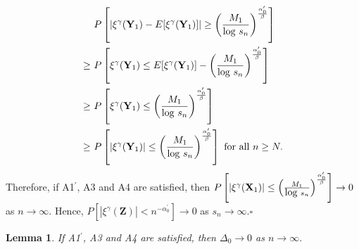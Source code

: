 \documentclass[twoside]{article}
\def\log{\hbox{log}}
\newcommand{\bX}{\mathbf{X}}
\newcommand{\bY}{\mathbf{Y}}
\newcommand{\bZ}{\mathbf{Z}}
\newcommand{\0}{\mathbf{0}}
\newcommand{\1}{\mathbf{1}}
\newcommand*{\QEDB}{\hfill\ensuremath{\square}}
\numberwithin{equation}{section}
\newtheorem{lemma}[thm]{Lemma}
\begin{document}
\begin{align*}
&\ P\left [|\xi^\gamma(\bY_1)-E[\xi^\gamma(\bY_1)]|\geq \left (\frac{M_1}{\log\ s_n}\right )^\frac{\alpha^\prime_0}{\beta}\right ]\\
\geq &\  P\left [\xi^\gamma(\bY_1)\leq E[\xi^\gamma(\bY_1)]-\left (\frac{M_1}{\log\ s_n}\right )^\frac{\alpha^\prime_0}{\beta}\right ]\\
\geq &\  P\left [\xi^\gamma(\bY_1)\leq \left (\frac{M_1}{\log\ s_n}\right )^\frac{\alpha^\prime_0}{\beta}\right ]\\
\geq &\  P\left [|\xi^\gamma(\bY_1)|\leq \left (\frac{M_1}{\log\ s_n}\right )^\frac{\alpha^\prime_0}{\beta}\right ]\text{ for all }n\geq N.
\end{align*}
Therefore, if A1$^\prime$, A3 and A4 are satisfied, then $P\left [|\xi^\gamma(\bX_1)|\leq \left (\frac{M_1}{\log\ s_n}\right )^\frac{\alpha^\prime_0}{\beta}\right ]\to 0 $ as $n\to\infty.$ Hence, $P[|\xi^\gamma(\bZ)|<n^{-\alpha^\prime_0}]\to 0$ as $s_n\to \infty.$\hfill\QEDB\newline
\begin{lemma}\label{Delta0_conv}
    If A1$^\prime$, A3 and A4 are satisfied, then $\Delta_0\to 0$ as $n\to\infty.$
\end{lemma}
\end{document}
